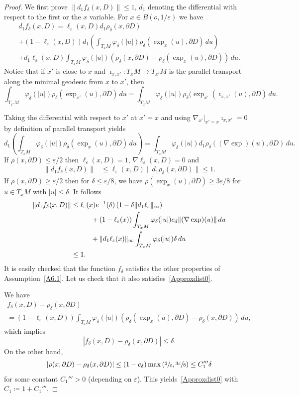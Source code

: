 \documentclass[JEP,XML,SOM,Unicode,NoFloatCountersInSection,published]{cedram}
\let\epsilon\varepsilon
\theoremstyle{plain}
\theoremstyle{definition}
\newcommand\df{\coloneqq}
\newcommand{\lt}{\left}
\newcommand{\rt}{\right}
\let\d\delta
\let\e\varepsilon
\let\n\nabla
\let\pa\partial
\let\iy\infty
\begin{document}
\begin{proof}
We first prove
$\|d_1 f_\d(x,D)\|\le 1$, $d_1$ denoting the differential with respect to the first or the $x$ variable.
For $x\in B(o,1/\e)$
we have
\begin{multline}
d_1f_\d(x,D)=\ell_\e(x,D)d_1\rho_\d(x,\partial D)\\
+(1-\ell_\e(x,D))d_1\left(\int_{T_xM}\varphi_\d(\vert u\vert )\rho_\d(\exp_x(u),\partial D)\, du\right)\\
+d_1\ell_\e(x,D)\int_{T_xM}\varphi_\d(\vert u\vert )\left(\rho_\d(x,\partial D)-\rho_\d(\exp_x(u),\partial D)\right)\, du.
\end{multline}
Notice that if $x'$ is close to $x$ and $\imath_{x,x'}:T_{x}M\to T_{x'}M$ is the parallel transport along the minimal geodesic from $x$ to $x'$, then
\[
\int_{T_{x'}M}\varphi_\d(\vert u\vert )\rho_\d(\exp_{x'}(u),\partial D)\, du=\int_{T_{x}M}\varphi_\d(\vert u\vert )\rho_\d(\exp_{x'}(\imath_{x,x'}(u),\partial D)\, du.
\]

Taking the differential with respect to $x'$ at $x'=x$ and using $\n_{x'}\vert_{x'=x}\imath_{x,x'}=0$ by definition of parallel transport yields
\[
d_1\left(\int_{T_{x}M}\varphi_\d(\vert u\vert )\rho_\d(\exp_{x}(u),\partial D)\, du\right)=\int_{T_{x}M}\varphi_\d(\vert u\vert )d_1\rho_\d((\n\exp)(u),\partial D)\, du.
\]
If $\rho(x,\partial D)\le \e/2$ then $\ell_\e(x,D)=1$, $\n\ell_\e(x,D)=0$ and
\begin{align*}
\|d_1f_\d(x,D)\|&\le \ell_\e(x,D)\|d_1\rho_\d(x,\partial D)\|\le 1.
\end{align*}
If $\rho(x,\partial D)\ge \e/2$ then for $\d\le \e/8$, we have $\rho(\exp_x(u),\pa D)\geq 3\e/8$ for $u\in T_xM$ with $\vert u\vert \leq \delta$. It follows
\begin{align*}
\|d_1f_\d(x,D)\|&\le\ell_\e(x)e^{-1}(\d)\left(1-\d \|d_1\ell_\e\|_\infty\right)\\
&\hspace*{1cm}+(1-\ell_\e(x))\int_{T_xM}\varphi_\d(\vert u\vert )c_d\|(\n\exp)(u)\|\, du\\
&\hspace*{1cm}+\|d_1\ell_\e(x)\|_\iy\int_{T_xM}\varphi_\d(\vert u\vert )\d\, du\\&\le 1.
\end{align*}
It is easily checked that the function $f_\d$ satisfies the other properties of Assumption~\ref{A6.1}. Let us check that it also satisfies~\eqref{Approxdist0}.
\par
We have
\begin{multline}\label{5.4.6.1}
f_\d(x,D)-\rho_\d(x,\partial D)\\
=(1-\ell_\e(x,D))\int_{T_xM}\varphi_\d(\vert u\vert )\left(\rho_\d(\exp_x(u),\partial D)-\rho_\d(x,\partial D)\right)\, du,
\end{multline}
which implies
\[
\left|f_\d(x,D)-\rho_\d(x,\partial D)\right|\le \d.
\]
On the other hand,
\[
\vert \rho(x,\partial D)-\rho_\d(x,\partial D)\vert\le
(1-c_\delta) \max \lt(\sfrac2\epsilon, \sfrac{3\epsilon}8\rt)
\le C_1'''\d
\]
for some constant $C_1'''>0$ (depending on $\e$).
This yields~\eqref{Approxdist0} with $C_1\df 1+C_1'''$.


\end{proof}
\end{document}
